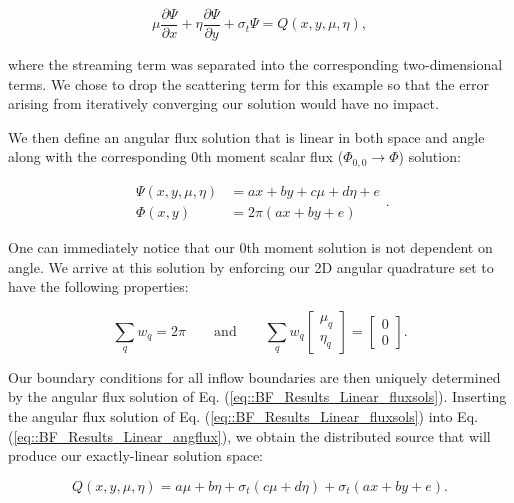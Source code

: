 \begin{equation}
\label{eq::BF_Results_Linear_angflux}
\mu \frac{\partial \Psi}{\partial x} + \eta \frac{\partial \Psi}{\partial y} + \sigma_t \Psi = Q(x,y, \mu, \eta), 
\end{equation}

\noindent where the streaming term was separated into the corresponding two-dimensional terms. We chose to drop the scattering term for this example so that the error arising from iteratively converging our solution would have no impact.

We then define an angular flux solution that is linear in both space and angle along with the corresponding 0th moment scalar flux ($\Phi_{0,0} \rightarrow \Phi$) solution:

\begin{equation}
\label{eq::BF_Results_Linear_fluxsols}
\begin{aligned}
\Psi (x,y,\mu,\eta) &= ax + by + c \mu + d\eta + e\\
\Phi (x,y) &= 2 \pi \left( ax + by  + e \right)
\end{aligned} .
\end{equation}

\noindent One can immediately notice that our 0th moment solution is not dependent on angle. We arrive at this solution by enforcing our 2D angular quadrature set to have the following properties:

\begin{equation}
\label{eq::BF_Results_Linear_quadrules}
\sum_{q} w_q = 2 \pi \qquad \text{and} \qquad \sum_{q} w_q  \left[
	\begin{array}{c}
		\mu_q \\
		\eta_q
	\end{array} \right] = \left[
	\begin{array}{c}
		0 \\
		0
	\end{array} \right] .
\end{equation}

Our boundary conditions for all inflow boundaries are then uniquely determined by the angular flux solution of Eq. (\ref{eq::BF_Results_Linear_fluxsols}). Inserting the angular flux solution of Eq. (\ref{eq::BF_Results_Linear_fluxsols}) into Eq. (\ref{eq::BF_Results_Linear_angflux}), we obtain the distributed source that will produce our exactly-linear solution space:

\begin{equation}
\label{eq::BF_Results_Linear_src}
Q(x,y,\mu,\eta) = a \mu + b \eta + \sigma_t \left(  c \mu + d \eta \right) + \sigma_t \left( ax +by + e   \right).
\end{equation}

